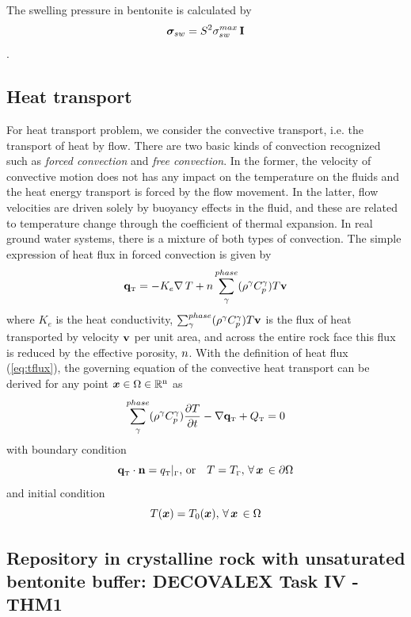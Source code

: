 The swelling pressure in bentonite is calculated by
\[
   \bm \sigma_{sw}=S^2 \sigma_{sw}^{max}\,\mathbf I
\].

\subsection{Heat transport}
For heat transport problem, we consider the convective transport,
i.e. the transport of heat by flow. There are two basic kinds of
convection recognized such as \emph{forced convection} and
\emph{free convection}. In the former, the velocity of convective
motion does not has any impact on the temperature on the fluids and
the heat energy transport is forced by the flow movement. In the
latter, flow velocities are driven solely by buoyancy effects in the
fluid, and these are related to temperature change through the
coefficient of thermal expansion. In real ground water systems,
there is a mixture of both types of convection. The simple
expression of heat flux in forced convection is given by
\begin{equation}
 \mathbf{q}_{\mbox{\tiny T}} = -K_e\nabla\,T+n\sum_{\gamma}^{phase}(\rho^{\gamma}C_p^{\gamma}) T\bf v
 \label{eq:tflux}
\end{equation}
where $K_e$ is the heat conductivity,
$\sum_{\gamma}^{phase}(\rho^{\gamma}C_p^{\gamma}) T\bf v$ is the flux of
heat transported by velocity $\bf v$ per unit area, and across the
entire rock face this flux is reduced by the effective porosity,
$n$. With the definition of heat flux (\ref{eq:tflux}), the
governing  equation of the convective heat transport can be derived
for any point $\bm x\in \Omega\in \mathbb{R}^{\mathrm{n}}$ as
\begin{equation}
 \sum_{\gamma}^{phase}(\rho^{\gamma}C_p^{\gamma})\dfrac{\partial T}{\partial t}-\nabla \mathbf{q}_{\mbox{\tiny T}}+Q_{\mbox{\tiny T}}=0
 \label{eq:tgrn}
\end{equation}
with boundary condition
\begin{equation}
 \mathbf{q}_{\mbox{\tiny T}}\cdot\mathbf n=q_{\mbox{\tiny
 T}}\vert_{\scriptscriptstyle{\Gamma}},\, \mbox{or}\quad
 T=T_{\scriptscriptstyle{\Gamma}}, \,
 \forall\, \bm x\, \in \partial \Omega
 \label{eq:tbc}
\end{equation}
and initial condition
\begin{equation}
 T(\bm x)=T_0(\bm x), \, \forall\, \bm x\, \in \Omega
 \label{eq:tini}
\end{equation}

\subsection[Repository in crystalline rock with unsat. bentonite buffer]{Repository in crystalline rock with unsaturated bentonite buffer: DECOVALEX Task IV - THM1}

